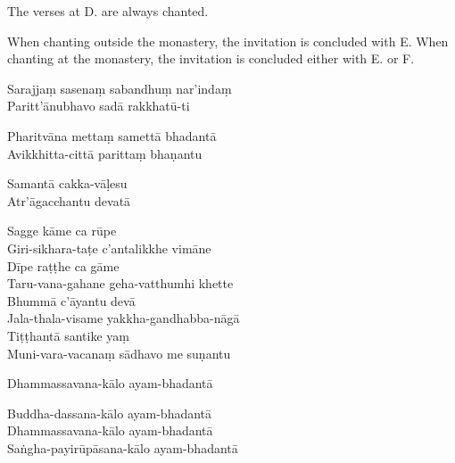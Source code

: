 The verses at D. are always chanted.

When chanting outside the monastery, the invitation is concluded with E. When
chanting at the monastery, the invitation is concluded either with E. or F.

\begin{paritta}


%
Sarajjaṃ sasenaṃ sabandhuṃ nar'indaṃ\\
Paritt'ānubhavo sadā rakkhatū-ti

%
Pharitvāna mettaṃ samettā bhadantā\\
Avikkhitta-cittā parittaṃ bhaṇantu

%
Samantā cakka-vāḷesu\\
Atr'āgacchantu devatā

%
Sagge kāme ca rūpe\\
Giri-sikhara-taṭe c'antalikkhe vimāne\\
Dīpe raṭṭhe ca gāme\\
Taru-vana-gahane geha-vatthumhi khette\\
Bhummā c'āyantu devā\\
Jala-thala-visame yakkha-gandhabba-nāgā\\
Tiṭṭhantā santike yaṃ\\
Muni-vara-vacanaṃ sādhavo me suṇantu

%
Dhammassavana-kālo ayam-bhadantā


%
Buddha-dassana-kālo ayam-bhadantā\\
Dhammassavana-kālo ayam-bhadantā\\
Saṅgha-payirūpāsana-kālo ayam-bhadantā
\end{paritta}


